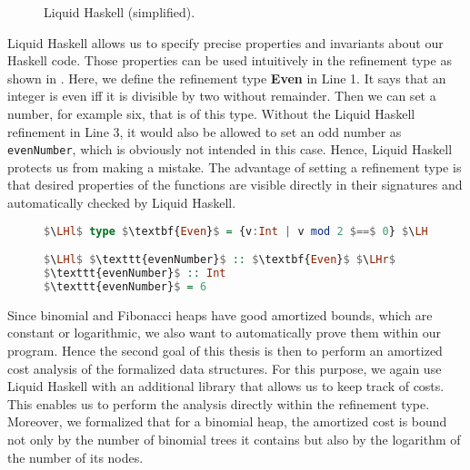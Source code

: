 \documentclass{clmthesis}
\begin{document}
\begin{figure}[h]
\centering
{}
\caption{Liquid Haskell (simplified).}
\label{fig:LH}
\end{figure}

Liquid Haskell allows us to specify precise properties and invariants about our Haskell code. Those properties can be used intuitively in the refinement type as shown in . Here, we define the refinement type \textbf{Even} in Line 1. It says that an integer is even iff it is divisible by two without remainder. Then we can set a number, for example six, that is of this type. Without the Liquid Haskell refinement in Line 3, it would also be allowed to set an odd number as \texttt{evenNumber}, which is obviously not intended in this case. Hence, Liquid Haskell protects us from making a mistake. 
The advantage of setting a refinement type is that desired properties of the functions are visible directly in their signatures and automatically checked by Liquid Haskell.

\begin{figure}[h]
\begin{lstlisting}[mathescape=true, language=haskell, caption={Refinement Example.},captionpos=b, label=fig:introex]
$\LHl$ type $\textbf{Even}$ = {v:Int | v mod 2 $==$ 0} $\LHr$

$\LHl$ $\texttt{evenNumber}$ :: $\textbf{Even}$ $\LHr$
$\texttt{evenNumber}$ :: Int
$\texttt{evenNumber}$ = 6
\end{lstlisting}
\end{figure}

Since binomial and Fibonacci heaps have good amortized bounds, which are constant or logarithmic, we also want to automatically prove them within our program. Hence the second goal of this thesis is then to perform an amortized cost analysis of the formalized data structures. For this purpose, we again use Liquid Haskell with an additional library that allows us to keep track of costs. This enables us to perform the analysis directly within the refinement type. Moreover, we formalized that for a binomial heap, the amortized cost is bound not only by the number of binomial trees it contains but also by the logarithm of the number of its nodes.
\end{document}
